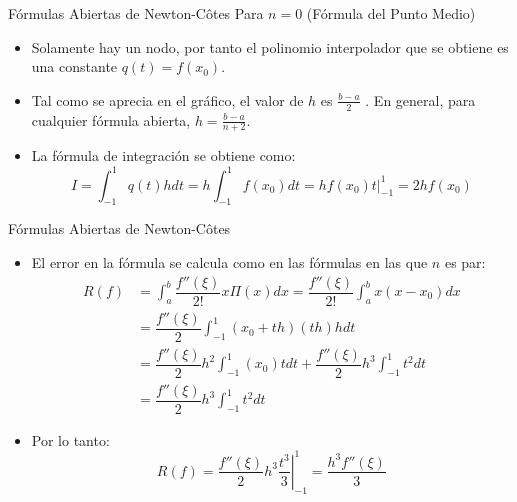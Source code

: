 \documentclass[12pt]{beamer}
\begin{document}
\begin{frame}{F\'ormulas Abiertas de Newton-C\^otes}
  Para $n=0$ (F\'ormula del Punto Medio)
  \begin{center}
  \end{center}
  \begin{itemize}
    \item Solamente hay un nodo, por tanto el polinomio interpolador que se obtiene es una constante $q(t) = f (x_0)$.
    \item<2-> Tal como se aprecia en el gráfico, el valor de $h$ es $\frac{b-a}{2}$
    . En general, para cualquier fórmula abierta, $h=\frac{b-a}{n+2}$.
    \item<3->La fórmula de integración se obtiene como:
    $$
    I = \int_{-1}^{1}q(t)hdt = h\int_{-1}^{1}f(x_0)dt = \left.hf(x_0)t\right|_{-1}^1 = 2hf(x_0)
    $$    
  \end{itemize}
\end{frame}
\begin{frame}{F\'ormulas Abiertas de Newton-C\^otes}
  \begin{itemize}
    \item El error en la fórmula se calcula como en las fórmulas en las que $n$ es par:
    \begin{align*}
      R(f) & = \int_{a}^{b}\dfrac{f''(\xi)}{2!}x\Pi(x)dx = \dfrac{f''(\xi)}{2!}\int_{a}^{b}x(x-x_0)dx\\
      & = \dfrac{f''(\xi)}{2}\int_{-1}^{1}(x_0+th)(th)hdt\\
      & = \dfrac{f''(\xi)}{2}h^2\int_{-1}^{1}(x_0)tdt + \dfrac{f''(\xi)}{2}h^3\int_{-1}^{1}t^2dt\\
      & = \dfrac{f''(\xi)}{2}h^3\int_{-1}^{1}t^2dt
    \end{align*}
    \item<2-> Por lo tanto:
    $$
    R(f) = \left.\dfrac{f''(\xi)}{2}h^3\dfrac{t^3}{3}\right|_{-1}^1 = \dfrac{h^3f''(\xi)}{3}
    $$
  \end{itemize}
\end{frame}
\end{document}
